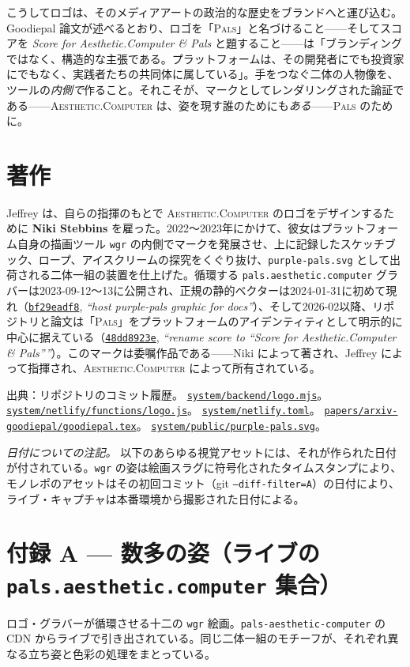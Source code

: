 \documentclass[10pt,letterpaper,twocolumn]{article}
\newcommand{\ac}{\textsc{Aesthetic}{\color{acpink}.}\textsc{Computer}}
\newcommand{\pals}{\textsc{Pals}}
\newcommand{\commit}[2]{\href{https://github.com/whistlegraph/aesthetic-computer/commit/#1}{\texttt{#1}}, \emph{``#2''}}
\newcommand{\repofile}[1]{\href{https://github.com/whistlegraph/aesthetic-computer/blob/main/#1}{\texttt{#1}}}
\begin{document}
こうしてロゴは、そのメディアアートの政治的な歴史をブランドへと運び込む。Goodiepal 論文が述べるとおり、ロゴを「\pals{}」と名づけること——そしてスコアを \emph{Score for Aesthetic{\color{acpink}.}Computer \& Pals} と題すること——は「ブランディングではなく、構造的な主張である。プラットフォームは、その開発者にでも投資家にでもなく、実践者たちの共同体に属している」。手をつなぐ二体の人物像を、ツールの\emph{内側で}作ること。それこそが、マークとしてレンダリングされた論証である——\ac{} は、姿を現す誰のためにも\emph{ある}——\pals{} のために。

\section{著作}

Jeffrey は、自らの指揮のもとで \ac{} のロゴをデザインするために \textbf{Niki Stebbins} を雇った。2022〜2023年にかけて、彼女はプラットフォーム自身の描画ツール \texttt{wgr} の内側でマークを発展させ、上に記録したスケッチブック、ロープ、アイスクリームの探究をくぐり抜け、\texttt{purple-pals.svg} として出荷される二体一組の装置を仕上げた。循環する \texttt{pals.aesthetic.computer} グラバーは2023-09-12〜13に公開され、正規の静的ベクターは2024-01-31に初めて現れ（\commit{bf29eadf8}{host purple-pals graphic for docs}）、そして2026-02以降、リポジトリと論文は「\pals{}」をプラットフォームのアイデンティティとして明示的に中心に据えている（\commit{48dd8923e}{rename score to ``Score for Aesthetic.Computer \& Pals''}）。このマークは委嘱作品である——Niki によって著され、Jeffrey によって指揮され、\ac{} によって所有されている。

\vspace{0.6em}
{\footnotesize\color{acgray}\noindent 出典：リポジトリのコミット履歴。
\repofile{system/backend/logo.mjs}。
\repofile{system/netlify/functions/logo.js}。
\repofile{system/netlify.toml}。
\repofile{papers/arxiv-goodiepal/goodiepal.tex}。
\repofile{system/public/purple-pals.svg}。\par}

\onecolumn
\appendix

\noindent\emph{日付についての注記。} 以下のあらゆる視覚アセットには、それが作られた日付が付されている。\texttt{wgr} の姿は絵画スラグに符号化されたタイムスタンプにより、モノレポのアセットはその初回コミット（git \texttt{--diff-filter=A}）の日付により、ライブ・キャプチャは本番環境から撮影された日付による。

\section*{付録 A — 数多の姿（ライブの \texttt{pals.aesthetic.computer} 集合）}
\noindent ロゴ・グラバーが循環させる十二の \texttt{wgr} 絵画。\texttt{pals-aesthetic-computer} の CDN からライブで引き出されている。同じ二体一組のモチーフが、それぞれ異なる立ち姿と色彩の処理をまとっている。
\vspace{1.2em}
\end{document}
